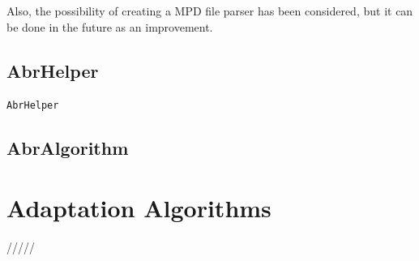Also, the possibility of 
creating a MPD file parser has been considered, but it can be done in the future as an improvement.

\subsection{AbrHelper}

\texttt{AbrHelper}

\subsection{AbrAlgorithm}

\section{Adaptation Algorithms}
\label{sec:abralgo}


/////



